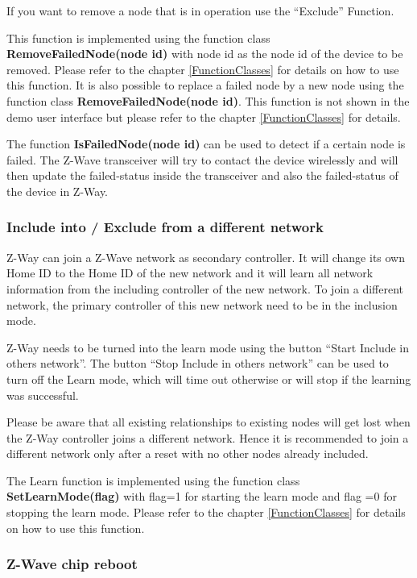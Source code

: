 If you want to remove a node that is in operation use the “Exclude” Function.


This function is implemented using the function class {\bf RemoveFailedNode(node id)} with node id as the node id of the device to be removed. Please refer to the chapter \ref{FunctionClasses} for details on how to use this function. It is also possible to replace a failed node by a new node using the function class {\bf RemoveFailedNode(node id)}. This function is not shown in the demo user interface but please refer to the  chapter \ref{FunctionClasses} for details.

The function {\bf IsFailedNode(node id)} can be used to detect if a certain node is failed. The Z-Wave transceiver will try to contact the device
 wirelessly and will then update the failed-status inside the transceiver and also the failed-status of the device in Z-Way.

\subsubsection{Include into / Exclude from a different network}

Z-Way can join a Z-Wave network as secondary controller. It will change its own Home ID to the Home ID of the new network and it will learn all network information 
from the including controller of the new network. To join a different network, the primary controller of this new network need to be in the inclusion mode.

Z-Way needs to be turned into the learn mode using the button “Start Include in others network”. The button “Stop Include in others network” can be used to turn off 
the Learn mode, which will time out otherwise or will stop if the learning was successful.

Please be aware that all existing relationships to existing nodes will get lost when the Z-Way controller joins a different network. Hence it is recommended to join a 
different network only after a reset with no other nodes already included. 

The Learn function is implemented using the function class {\bf SetLearnMode(flag)} with flag=1 for starting the learn mode and flag =0 for stopping the 
learn mode. Please refer to the chapter \ref{FunctionClasses} for details on how to use this function.


\subsubsection{Z-Wave chip reboot}


